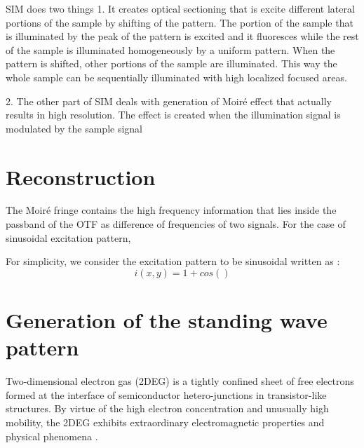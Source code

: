 \documentclass[11pt]{article}
\begin{document}
SIM does two things
1. It creates optical sectioning that is excite different lateral portions of the sample by shifting of the pattern. The portion of the sample that is illuminated by the peak of the pattern is excited and it fluoresces while the rest of the sample is illuminated homogeneously by a uniform pattern. When the pattern is shifted, other portions of the sample are illuminated. This way the whole sample can be sequentially illuminated with high localized focused areas.

2. The other part of SIM deals with generation of Moiré effect that actually results in high resolution. The effect is created when the illumination signal is modulated by the sample signal

\section{Reconstruction}

The Moiré fringe contains the high frequency information that lies inside the passband of the OTF as difference of frequencies of two signals. For the case of sinusoidal excitation pattern,

For simplicity, we consider the excitation pattern to be sinusoidal written as \cite{Heintzmann1999a}:
%
\begin{equation}
  i(x,y) = 1 + cos()
\end{equation}
%
\section{Generation of the standing wave pattern}

Two-dimensional electron gas (2DEG) is a tightly confined sheet of free electrons formed at the interface of semiconductor hetero-junctions in transistor-like structures. By virtue of the high electron concentration and unusually high mobility, the 2DEG exhibits extraordinary electromagnetic properties and physical phenomena \cite{Andress_2012,Tsui_1982,Reyren_2007}.
\end{document}
